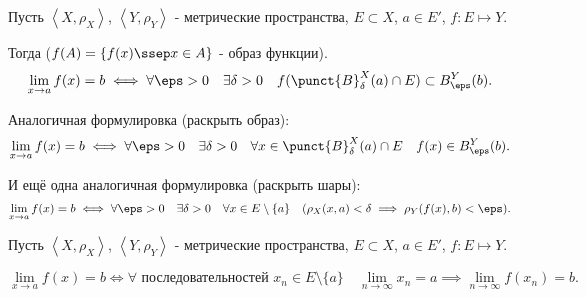 \begin{definition}[Коши] \thmslashn 

    Пусть $\left<X, \rho_{X}\right>$, $\left<Y, \rho_{Y}\right>$ - метрические пространства, $E \subset X$, $a\in E'$, $f : E \mapsto Y$.

    Тогда ($f(A) = \{f(x) \ssep x\in A\} $ - образ функции).
    \[ \lim\limits_{x \to a} f(x) = b \iff \forall{\eps > 0}\quad \exists{\delta > 0}\quad f(\punct{B}^{X}_{\delta}(a)\cap E) \subset B^{Y}_{\eps}(b) .\] 

    Аналогичная формулировка (раскрыть образ):
    \[ \lim\limits_{x \to a} f(x) = b \iff \forall{\eps > 0}\quad \exists{\delta > 0}\quad \forall{x\in \punct{B}^{X}_{\delta}(a)\cap E}\quad f(x)\in B^{Y}_{\eps}(b)  .\]

    И ещё одна аналогичная формулировка (раскрыть шары):
    \[ \lim\limits_{x \to a} f(x) = b \iff \forall{\eps > 0}\quad \exists{\delta > 0}\quad \forall{x\in E \setminus \{a\} }\quad (\rho_{X}(x, a) < \delta \implies \rho_{Y}(f(x), b) < \eps)  .\] 
\end{definition}
\begin{definition}[Гёйне] \thmslashn 

    Пусть $\left<X, \rho_{X}\right>$, $\left<Y, \rho_{Y}\right>$ - метрические пространства, $E \subset X$, $a\in E'$, $f : E \mapsto Y$.

    \[ \lim\limits_{x \to a} f(x) = b \iff \forall\text{ последовательностей } x_{n}\in E \setminus \{a\}\quad \lim\limits_{n \to \infty} x_{n} = a \implies \lim\limits_{n \to \infty} f(x_{n}) = b .\] 
\end{definition}
